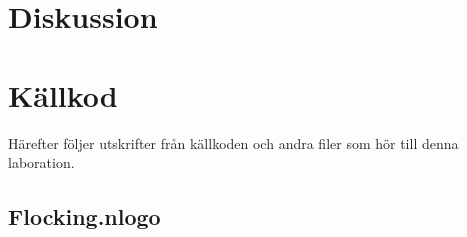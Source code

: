 \documentclass[titlepage, twocolumn, a4paper, 12pt]{article}
\begin{document}
\section{Diskussion}




\newpage
\appendix
{}
\section{Källkod}\label{sec:kallkod}
Härefter följer utskrifter från källkoden och andra filer som hör till
denna laboration.

\subsection{Flocking.nlogo}\label{app:Flocking.nlogo}
\begin{footnotesize}
  
\end{footnotesize}
\end{document}
